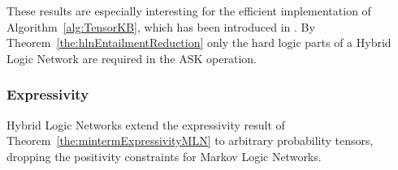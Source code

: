 
These results are especially interesting for the efficient implementation of Algorithm~\ref{alg:TensorKB}, which has been introduced in .
By Theorem~\ref{the:hlnEntailmentReduction} only the hard logic parts of a Hybrid Logic Network are required in the ASK operation.

\subsubsection{Expressivity}

Hybrid Logic Networks extend the expressivity result of Theorem~\ref{the:mintermExpressivityMLN} to arbitrary probability tensors, dropping the positivity constraints for Markov Logic Networks.

